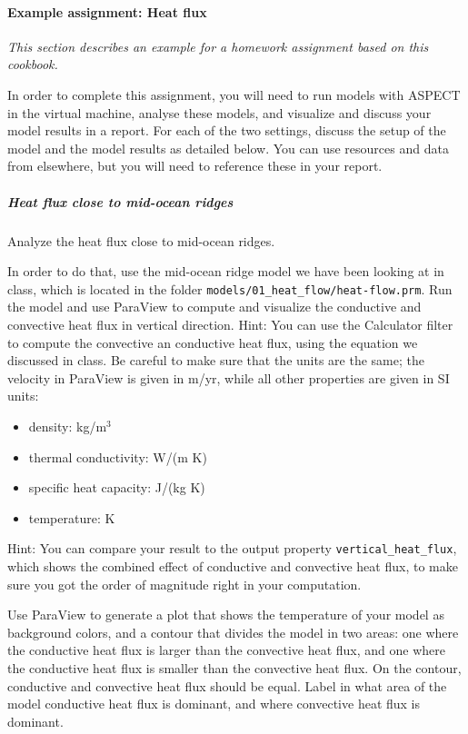 \paragraph{Example assignment: Heat flux}
\textit{This section describes an example for a homework assignment based on this cookbook.}

In order to complete this assignment, you will need to run models with ASPECT in the virtual machine, analyse these models, and visualize and discuss your model results in a report. For each of the two settings, discuss the setup of the model and the model results as detailed below. You can use resources and data from elsewhere, but you will need to reference these in your report.

\subparagraph{Heat flux close to mid-ocean ridges}
Analyze the heat flux close to mid-ocean ridges. 

In order to do that, use the mid-ocean ridge model we have been looking at in class, which is located in the folder \texttt{models/01\_heat\_flow/heat-flow.prm}. Run the model and use ParaView to compute and visualize the conductive and convective heat flux in vertical direction. 
Hint: You can use the Calculator filter to compute the convective an conductive heat flux, using the equation we discussed in class. Be careful to make sure that the units are the same; the velocity in ParaView is given in m/yr, while all other properties are given in SI units:

\begin{itemize}
\item density: kg/m$^3$
\item thermal conductivity: W/(m K) 
\item specific heat capacity: J/(kg K) 
\item temperature: K 
\end{itemize}

Hint: You can compare your result to the output property \texttt{vertical\_heat\_flux}, which shows the combined effect of conductive and convective heat flux, to make sure you got the order of magnitude right in your computation. 

Use ParaView to generate a plot that shows the temperature of your model as background colors, 
and a contour that divides the model in two areas: one where the conductive heat flux is larger than the convective heat flux, and one where the conductive heat flux is smaller than the convective heat flux. On the contour, conductive and convective heat flux should be equal. 
Label in what area of the model conductive heat flux is dominant, and where convective heat flux is dominant. 

